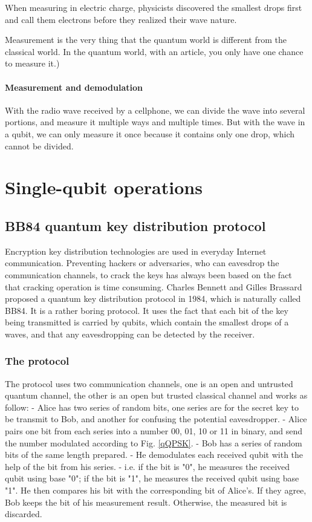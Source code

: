\documentclass{book}
\begin{document}
When measuring in electric charge, physicists discovered the smallest drops first and call them electrons before they realized their wave nature.

Measurement is the very thing that the quantum world is different from the classical world. In the quantum world, with an article, you only have one chance to measure it.)

\subsubsection{Measurement and demodulation}
With the radio wave received by a cellphone, we can divide the wave into several portions, and measure it multiple ways and multiple times. But with the wave in a qubit, we can only measure it once because it contains only one drop, which cannot be divided.

\chapter{Single-qubit operations}

\section{BB84 quantum key distribution protocol}
Encryption key distribution technologies are used in everyday Internet communication. Preventing hackers or adversaries, who can eavesdrop the communication channels, to crack the keys has always been based on the fact that cracking operation is time consuming. Charles Bennett and Gilles Brassard proposed a quantum key distribution protocol in 1984, which is naturally called BB84. It is a rather boring protocol. It uses the fact that each bit of the key being transmitted is carried by qubits, which contain the smallest drops of a waves, and that any eavesdropping can be detected by the receiver.

\subsection{The protocol}
The protocol uses two communication channels, one is an open and untrusted quantum channel, the other is an open but trusted classical channel and works as follow:
- Alice has two series of random bits, one series are for the secret key to be transmit to Bob, and another for confusing the potential eavesdropper. - Alice pairs one bit from each series into a number 00, 01, 10 or 11 in binary, and send the number modulated according to Fig. \ref{qQPSK}.
- Bob has a series of random bits of the same length prepared.
- He demodulates each received qubit with the help of the bit from his series.
- 
i.e. if the bit is "0", he measures the received qubit using base "0"; if the bit is "1", he measures the received qubit using base "1". He then compares his bit with the corresponding bit of Alice's. If they agree, Bob keeps the bit of his measurement result. Otherwise, the measured bit is discarded.
\end{document}
